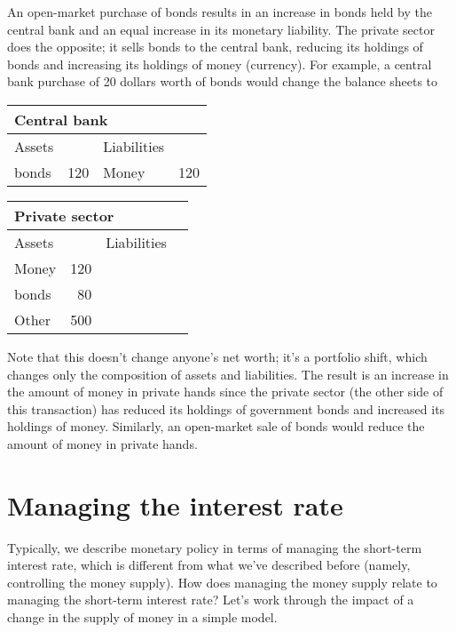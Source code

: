 An open-market purchase of bonds  results in an increase
in bonds  held by the central bank  and an equal increase in its
monetary liability.
The private sector does the opposite;  it sells bonds  to
the central bank, reducing its holdings of bonds  and
increasing its holdings of money (currency).
For example, a central bank  purchase of 20 dollars worth of bonds  would change
the balance sheets to
%
\begin{center}
\begin{tabular}{lr|lr}
\multicolumn{4}{l}{Central bank } \\
\hline
Assets\phantom{ities}  &&  Liabilities \\
\hline
bonds \index{bond} &  120 & Money & 120
\end{tabular}
\end{center}
%
%
\begin{center}
\begin{tabular}{lr|lr}
\multicolumn{4}{l}{Private sector} \\
\hline
Assets\phantom{ities}  &&  Liabilities & \phantom{100} \\
\hline
Money &  120  &  \phantom{Money} & \phantom{100} \\
bonds  &  \phantom{1}80 \\
Other &  500
\end{tabular}
\end{center}
%
Note that this doesn't change anyone's net worth;
it's a portfolio shift, which changes only the composition
of assets and liabilities. 
The result is an increase in the amount of money in private hands
since the private sector (the other side of this transaction)
has reduced its holdings of government bonds  and increased its holdings of money.
Similarly, an open-market sale of bonds  would reduce the amount of money in
private hands.


\section{Managing the interest rate}

Typically, we describe monetary policy in terms of
managing the short-term interest rate,
which is different from what we've described before
(namely, controlling the money supply).
How does managing the money supply relate to managing the short-term interest rate?
Let's work through the impact of a change in the supply of money in a simple model.

